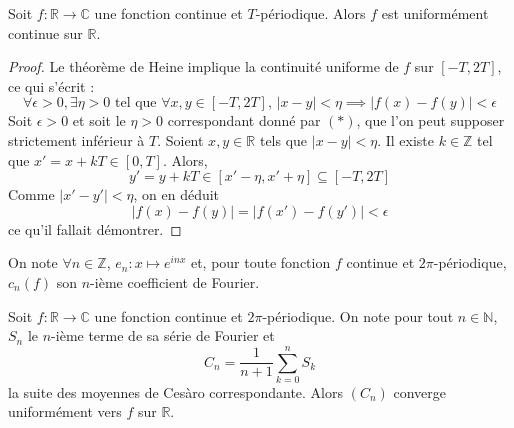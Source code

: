 





  \begin{lemma}
    \label{theoreme-de-fejer-1}
    Soit $f : \mathbb{R} \rightarrow \mathbb{C}$ une fonction continue et $T$-périodique. Alors $f$ est uniformément continue sur $\mathbb{R}$.
  \end{lemma}

  \begin{proof}
    Le théorème de Heine implique la continuité uniforme de $f$ sur $[-T, 2T]$, ce qui s'écrit :
    \[ \forall \epsilon > 0, \exists \eta > 0 \text{ tel que } \forall x, y \in [-T, 2T], \, \vert x - y \vert < \eta \implies \vert f(x) - f(y) \vert < \epsilon \tag{$*$} \]
    Soit $\epsilon > 0$ et soit le $\eta > 0$ correspondant donné par $(*)$, que l'on peut supposer strictement inférieur à $T$. Soient $x, y \in \mathbb{R}$ tels que $\vert x - y \vert < \eta$. Il existe $k \in \mathbb{Z}$ tel que $x' = x + kT \in [0,T]$. Alors,
    \[ y' = y + kT \in [x'-\eta, x'+\eta] \subseteq [-T, 2T] \]
    Comme $\vert x' - y' \vert < \eta$, on en déduit
    \[ \vert f(x) - f(y) \vert = \vert f(x') - f(y') \vert < \epsilon \]
    ce qu'il fallait démontrer.
  \end{proof}


  \begin{notation}
    On note $\forall n \in \mathbb{Z}$, $e_n : x \mapsto e^{inx}$ et, pour toute fonction $f$ continue et $2\pi$-périodique, $c_n(f)$ son $n$-ième coefficient de Fourier.
  \end{notation}

  \begin{theorem}
    Soit $f : \mathbb{R} \rightarrow \mathbb{C}$ une fonction continue et $2\pi$-périodique. On note pour tout $n \in \mathbb{N}$, $S_n$ le $n$-ième terme de sa série de Fourier et
    \[ C_n = \frac{1}{n+1} \sum_{k=0}^{n} S_k \]
    la suite des moyennes de Cesàro correspondante. Alors $(C_n)$ converge uniformément vers $f$ sur $\mathbb{R}$.
  \end{theorem}

